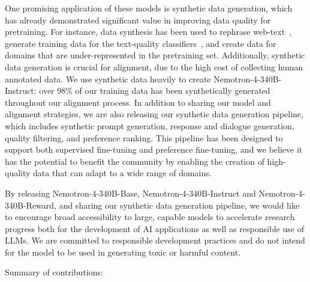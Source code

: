 \documentclass[11pt]{article}
\newcommand{\ours}{Nemotron-4-340B-Base}
\newcommand{\oursin}{Nemotron-4-340B-Instruct}
\newcommand{\oursrm}{Nemotron-4-340B-Reward}
\begin{document}
One promising application of these models is synthetic data generation, which has already demonstrated significant value in improving data quality for pretraining. For instance, data synthesis has been used to rephrase web-text~\citep{maini2024rephrasing}, generate training data for the text-quality classifiers~\citep{llama3,fineweb24}, and create data for domains that are under-represented in the pretraining set. 
Additionally, synthetic data generation is crucial for alignment, due to the high cost of collecting human annotated data.
We use synthetic data heavily to create \oursin{}: over 98\% of our training data has been synthetically generated throughout our alignment process.
In addition to sharing our model and alignment strategies, we are also releasing our synthetic data generation pipeline, which includes synthetic prompt generation, response and dialogue generation, quality filtering, and preference ranking. 
This pipeline has been designed to support both supervised fine-tuning and preference fine-tuning, and we believe it has the potential to benefit the community by enabling the creation of high-quality data that can adapt to a wide range of domains.

By releasing \ours{}, \oursin{} and \oursrm{}, and sharing our synthetic data generation pipeline, we would like to encourage broad accessibility to large, capable models to accelerate research progress both for the development of AI applications as well as responsible use of LLMs.
We are committed to responsible development practices and do not intend for the model to be used in generating toxic or harmful content.

Summary of contributions:
\end{document}
